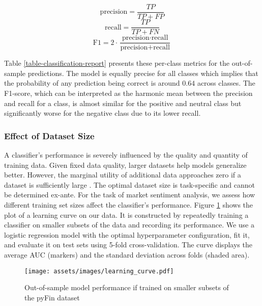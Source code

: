 \begin{equation}
	\textrm{precision} = \frac{TP}{TP + FP}
\end{equation}
\begin{equation}
	\textrm{recall} = \frac{TP}{TP + FN}
\end{equation}
\begin{equation}
	\textrm{F1} = 2 \cdot \frac{\textrm{precision} \cdot \textrm{recall}}{\textrm{precision} + \textrm{recall}}
\end{equation}

Table \ref{table-classification-report} presents these per-class metrics for the out-of-sample predictions. The model is equally precise for all classes which implies that the probability of any prediction being correct is around $0.64$ across classes. The F1-score, which can be interpreted as the harmonic mean between the precision and recall for a class, is almost similar for the positive and neutral class but significantly worse for the negative class due to its lower recall. 



\subsubsection{Effect of Dataset Size}
A classifier's performance is severely influenced by the quality and quantity of training data. Given fixed data quality, larger datasets help models generalize better. However, the marginal utility of additional data approaches zero if a dataset is sufficiently large . The optimal dataset size is task-specific and cannot be determined ex-ante. For the task of market sentiment analysis, we assess how different training set sizes affect the classifier's performance. Figure \ref{figure-learning-curve} shows the plot of a learning curve on our data. It is constructed by repeatedly training a classifier on smaller subsets of the data and recording its performance. We use a logistic regression model with the optimal hyperparameter configuration, fit it, and evaluate it on test sets using 5-fold cross-validation. The curve displays the average AUC (markers) and the standard deviation across folds (shaded area).

\begin{figure}[!ht]
	\centering
	\texttt{[image: assets/images/learning\_curve.pdf]}
	\caption{Out-of-sample model performance if trained on smaller subsets of the pyFin dataset}
	\label{figure-learning-curve}
\end{figure}

